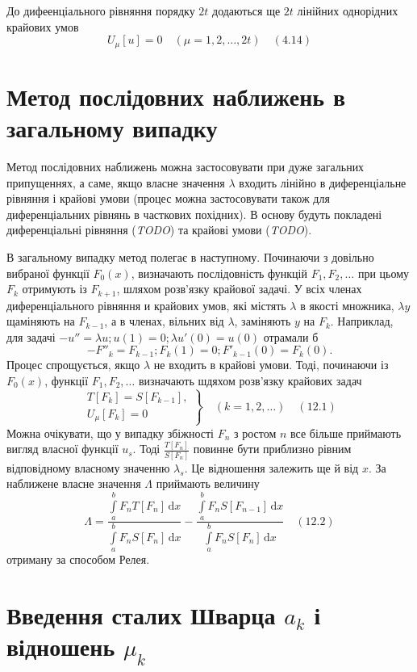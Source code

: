 \documentclass[12pt,a4paper]{article}
\begin{document}
До дифеенціального рівняння порядку $2t$ додаються ще $2t$ лінійних однорідних крайових умов
\[
U_\mu [u] = 0 \quad (\mu = 1, 2, \dots, 2t)   \quad (4.14)
\]

\clearpage

\section{Метод послідовних наближень в загальному випадку}Метод послідовних наближень можна застосовувати при дуже загальних припущеннях, а саме, якщо власне значення $\lambda$ входить лінійно в диференціальне рівняння і крайові умови (процес можна застосовувати також для диференціальних рівнянь в часткових похідних). В основу будуть покладені диференціальні рівняння (\emph{TODO}) та крайові умови (\emph{TODO}).

В загальному випадку метод полегає в наступному. Починаючи з довільно вибраної функції $F_0(x)$, визначають послідовність функцій $F_1, F_2, \dots$ при цьому $F_k$ отримують із $F_{k+1}$, шляхом розв'язку крайової задачі. У всіх членах диференціального рівняння и крайових умов, які містять $\lambda$ в якості множника, $\lambda y$ щаміняють на $F_{k-1}$, а в членах, вільних від $\lambda$, заміняють $y$ на $F_k$. Наприклад, для задачі $- u'' = \lambda u; u(1) = 0; \lambda u'(0) = u(0)$ отрамали б
\[
	- F''_k = F_{k-1}; F_k(1) = 0; F'_{k-1}(0) = F_k(0).
\] 
Процес спрощується, якщо $\lambda$ не входить в крайові умови. Тоді, починаючи із $F_0(x)$, функції $F_1, F_2, \dots$ визначають шдяхом розв'язку крайових задач
\[
\left.
\begin{array}{l}
	T[F_k] = S[F_{k-1}],\\
	U_\mu[F_k] = 0
\end{array} \right\}
\quad
(k = 1, 2, \dots)   \quad (12.1)
\]
Можна очікувати, що у випадку збіжності $F_n$ з ростом $n$ все більше приймають вигляд власної функції $u_s$. Тоді $\frac{T[F_n]}{S[F_n]}$ повинне бути приблизно рівним відповідному власному значенню $\lambda_s$. Це відношення залежить ще й від $x$. За наближене власне значення $\Lambda$ приймають величину
\[
\Lambda = \frac{\int\limits_a^b F_n T[F_n]\,\mathrm{d}x}
			   {\int\limits_a^b F_n S[F_n]\,\mathrm{d}x}
		  -
		  \frac{\int\limits_a^b F_n S[F_{n-1}]\,\mathrm{d}x}
			   {\int\limits_a^b F_n S[F_n]\,\mathrm{d}x}
   \quad (12.2)
\]
отриману за способом Релея.

\section{Введення сталих Шварца $a_k$ і відношень $\mu_k$}
\end{document}

